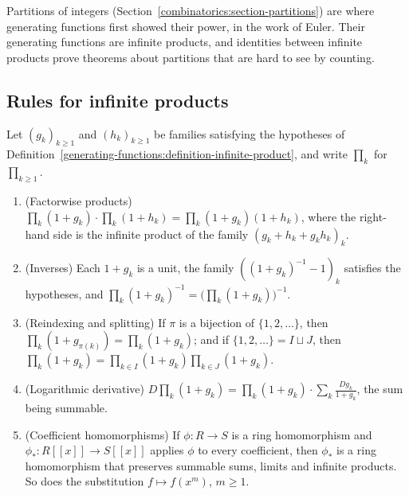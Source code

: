 Partitions of integers (Section~\ref{combinatorics:section-partitions}) are where generating functions first showed their power, in the work of Euler. Their generating functions are infinite
products, and identities between infinite products prove theorems about partitions that are hard to see by counting.

\subsection{Rules for infinite products}\label{generating-functions:subsection-product-rules}

\begin{lemma}\label{generating-functions:lemma-product-rules}
Let $(g_k)_{k \geq 1}$ and $(h_k)_{k \geq 1}$ be families satisfying the hypotheses of Definition~\ref{generating-functions:definition-infinite-product}, and write $\prod_k$ for $\prod_{k \geq 1}$.
\begin{enumerate}
\item (Factorwise products) $\prod_k(1 + g_k) \cdot \prod_k(1 + h_k) = \prod_k(1 + g_k)(1 + h_k)$, where the right-hand side is the infinite product of the family $(g_k + h_k + g_kh_k)_k$.
\item (Inverses) Each $1 + g_k$ is a unit, the family $((1 + g_k)^{-1} - 1)_k$ satisfies the hypotheses, and $\prod_k(1 + g_k)^{-1} = \bigl(\prod_k(1 + g_k)\bigr)^{-1}$.
\item (Reindexing and splitting) If $\pi$ is a bijection of $\{1, 2, \ldots\}$, then $\prod_k(1 + g_{\pi(k)}) = \prod_k(1 + g_k)$; and if $\{1, 2, \ldots\} = I \sqcup J$, then
$\prod_k(1 + g_k) = \prod_{k \in I}(1 + g_k)\prod_{k \in J}(1 + g_k)$.
\item (Logarithmic derivative) $D\prod_k(1 + g_k) = \prod_k(1 + g_k) \cdot \sum_k\frac{Dg_k}{1 + g_k}$, the sum being summable.
\item (Coefficient homomorphisms) If $\phi \colon R \to S$ is a ring homomorphism and $\phi_\ast \colon R[[x]] \to S[[x]]$ applies $\phi$ to every coefficient, then $\phi_\ast$ is a ring homomorphism
that preserves summable sums, limits and infinite products. So does the substitution $f \mapsto f(x^m)$, $m \geq 1$.
\end{enumerate}
\end{lemma}


